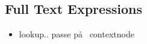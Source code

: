 \subsection{Full Text Expressions}
\label{sect:trans:TD:fulltext}
\begin{itemize}
  \item lookup.. passe p\aa~ contextnode
\end{itemize}
